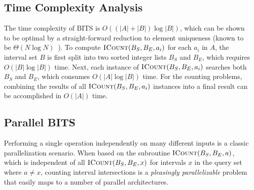 \documentclass{bioinfo}
\begin{document}
\subsection{Time Complexity Analysis}

The time complexity of BITS is $O( (|A|+|B|) \log |B|)$, which can
be shown to be optimal by a straight-forward reduction to element uniqueness
(known to be $\Theta(N\log N)$~\citep{misra1982}).  To compute
$\textsc{ICount}(B_S,B_E,a_i)$ for each $a_i$ in $A$, the interval set $B$ is
first split into two sorted integer lists $B_S$ and $B_E$, which requires $O(|B|
\log |B|)$ time.  Next, each instance of $\textsc{ICount}(B_S,B_E,a_i)$ searches
both $B_S$ and $B_E$, which consumes $O(|A| \log |B|)$ time.  For the counting
problems, combining the results of all $\textsc{ICount}(B_S,B_E,a_i)$ instances
into a final result can be accomplished in $O(|A|)$ time.  



\subsection{Parallel BITS}

Performing a single operation independently on many different inputs is a
classic parallelization scenario.  When based on the subroutine
$\textsc{ICount}(B_S,B_E,a)$, which is independent of all
$\textsc{ICount}(B_S,B_E,x)$ for intervals $x$ in the query set where $a \neq
x$, counting interval intersections is a {\em pleasingly parallelizable} problem
that easily maps to a number of parallel architectures.
\end{document}
